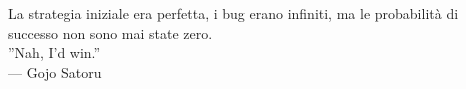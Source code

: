 \cleardoublepage
{}
\thispagestyle{empty}

\vspace*{3cm}

\begin{center}
    La strategia iniziale era perfetta, i bug erano infiniti, 
    ma le probabilità di successo non sono mai state zero.
    \\ \medskip \medskip
    ''Nah, I'd win.'' \\ \medskip
    --- Gojo Satoru
\end{center}

\medskip

